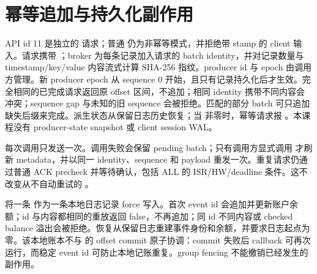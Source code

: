 \section{幂等追加与持久化副作用}
API id 11 是独立的  请求；普通  仍为非幂等模式，并拒绝带 stamp 的 client 输入。请求携带 ；broker 为每条记录加入请求的 batch identity，并对记录数量与 timestamp/key/value 内容流式计算 SHA-256 指纹。producer id 与 epoch 由调用方管理。新 producer epoch 从 sequence 0 开始，且只有记录持久化后才生效。完全相同的已完成请求返回原 offset 区间，不追加；相同 identity 携带不同内容会冲突；sequence gap 与未知的旧 sequence 会被拒绝。匹配的部分 batch 可只追加缺失后缀来完成。派生状态从保留日志历史恢复；当  非零时，幂等请求报 。本课程没有 producer-state snapshot 或 client session WAL。

 每次调用只发送一次。调用失败会保留 pending batch；只有调用方显式调用  才刷新 metadata，并以同一 identity、sequence 和 payload 重发一次。重复请求仍通过普通 ACK precheck 并等待确认，包括 ALL 的 ISR/HW/deadline 条件。这不改变从不自动重试的 。

 将一条  作为一条本地日志记录 force 写入。首次 event id 会追加并更新账户余额；id 与内容都相同的重放返回 false，不再追加；同 id 不同内容或 checked balance 溢出会被拒绝。恢复从保留日志重建事件身份和余额，并要求日志起点为零。该本地账本不与  的 offset commit 原子协调：commit 失败后 callback 可再次运行，而稳定 event id 可防止本地记账重复。group fencing 不能撤销已经发生的副作用。
